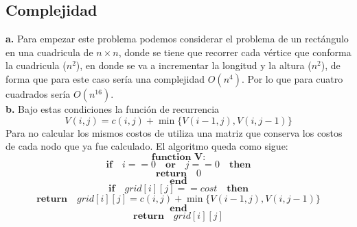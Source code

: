 \documentclass[14pt,a4paper]{report}
\begin{document}
\subsection*{Complejidad}
\textbf{a.}\quad
Para empezar este problema podemos considerar el problema de un rectángulo en una cuadricula de $n\times n$, donde se tiene que recorrer cada vértice que conforma la cuadricula ($n^2$), en donde se va a incrementar la longitud y la altura ($n^2$), de forma que para este caso sería una complejidad $O(n^4)$.
Por lo que para cuatro cuadrados sería $O(n^16)$. 
\\
\textbf{b.}\quad
Bajo estas condiciones la función de recurrencia
\begin{equation*}
	V(i,j)=c(i,j)+\min\{V(i-1,j),V(i,j-1)\}
\end{equation*}
Para no calcular los mismos costos de utiliza una matriz que conserva los costos de cada nodo que ya fue calculado. El algoritmo queda como sigue:
$$
\textbf{function V:}
$$
$$
\textbf{if}\quad i==0\quad\textbf{or}\quad j==0\quad\textbf{then}
$$
$$\textbf{return}\quad 0
$$
$$
\textbf{end}
$$
$$
\textbf{if}\quad\textit{grid}[i][j]==cost\quad\textbf{then}
$$
$$
\textbf{return}\quad\textit{grid}[i][j]=c(i,j)+\min\{V(i-1,j),V(i,j-1)\}
$$
$$
\textbf{end}
$$
$$
\textbf{return}\quad grid[i][j]
$$
\\
\end{document}
